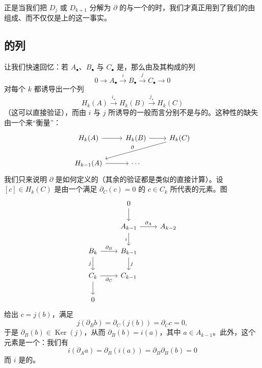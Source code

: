 \begin{remark}\label{thm:appB-kunneth-integral-fails}
正是当我们把 $D_j$ 或 $D_{k+1}$ 分解为 $\partial$ 的\trKernel{}与一个\trComplement{}的\trDirectSum{}时，我们才真正用到了我们的\trComplex{}由\trVectorSpace{}组成、而不仅仅是\trCommutativeRing{}上的\trModule{}这一事实。
\end{remark}

\subsection{\trComplex{}的\trExact{}列}
\label{subsec:appB-exact-sequences}

让我们快速回忆：若 $A_{\bullet}$、$B_{\bullet}$ 与 $C_{\bullet}$ 是\trChainComplex，那么由\trChainComplex{}及其\trMorphism{}构成的\trExact{}列
\[
0 \longrightarrow A_{\bullet} \xrightarrow{\ i\ } B_{\bullet} \xrightarrow{\ j\ } C_{\bullet} \longrightarrow 0
\]
对每个 $k$ 都诱导出一个\trExact{}列
\[
H_k(A) \xrightarrow{\ i_\star\ } H_k(B) \xrightarrow{\ j_\star\ } H_k(C)
\]
（这可以直接验证），而由 $i$ 与 $j$ 所诱导的\trMorphism{}一般而言分别不是\trInjective{}与\trSurjective{}的。这种\trExact{}性的缺失由一个\trLongExactSequence{}来“衡量”：
\[
\begin{tikzcd}
H_k(A) \arrow[r] & H_k(B) \arrow[r] & H_k(C) \arrow[dll, "\partial"'] \\
H_{k-1}(A) \arrow[r] & \cdots
\end{tikzcd}
\]
我们只来说明\trConnectingHomomorphism{} $\partial$ 是如何定义的（其余的验证都是类似的直接计算）。设 $[c] \in H_k(C)$ 是由一个满足 $\partial_C(c) = 0$ 的 $c \in C_k$ 所代表的元素。图
\[
\begin{tikzcd}
 & 0 \arrow[d] \\
 & A_{k-1} \arrow[r, "\partial_A"] \arrow[d, "i"'] & A_{k-2} \\
B_k \arrow[r, "\partial_B"] \arrow[d, "j"'] & B_{k-1} \arrow[d, "j"] \\
C_k \arrow[r, "\partial_C"'] \arrow[d] & C_{k-1} \\
0
\end{tikzcd}
\]
给出 $c = j(b)$，满足
\[
j(\partial_B b) = \partial_C(j(b)) = \partial_C c = 0,
\]
于是 $\partial_B(b) \in \operatorname{Ker}(j)$，从而 $\partial_B(b) = i(a)$，其中 $a \in A_{k-1}$。此外，这个元素是一个\trCycle：我们有
\[
i(\partial_A a) = \partial_B(i(a)) = \partial_B \partial_B(b) = 0
\]
而 $i$ 是\trInjective{}的。
